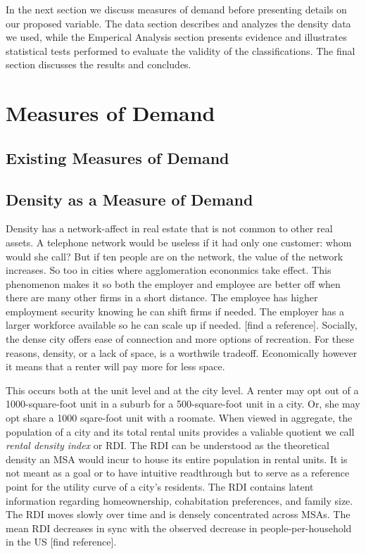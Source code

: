 \documentclass[sn-mathphys-num]{sn-jnl}%
\theoremstyle{thmstyleone}%
\theoremstyle{thmstyletwo}%
\theoremstyle{thmstylethree}%
\begin{document}
In the next section we discuss measures of demand before presenting details on our proposed variable. The data section describes and analyzes the density data we used, while the Emperical Analysis section presents evidence and illustrates statistical tests performed to evaluate the validity of the classifications. The final section discusses the results and concludes. 
 
\section{Measures of Demand}
\subsection{Existing Measures of Demand}
\subsection{Density as a Measure of Demand}
Density has a network-affect in real estate that is not common to other real assets. A telephone network would be useless if it had only one customer: whom would she call? But if ten people are on the network, the value of the network increases. So too in cities where agglomeration econonmics take effect. This phenomenon makes it so both the employer and employee are better off when there are many other firms in a short distance. The employee has higher employment security knowing he can shift firms if needed. The employer has a larger workforce available so he can scale up if needed. [find a reference]. Socially, the dense city offers ease of connection and more options of recreation. For these reasons, density, or a lack of space, is a worthwile tradeoff. Economically however it means that a renter will pay more for less space.

This occurs both at the unit level and at the city level. A renter may opt out of a 1000-square-foot unit in a suburb for a 500-square-foot unit in a city. Or, she may opt share a 1000 sqare-foot unit with a roomate. When viewed in aggregate, the population of a city and its total rental units provides a valiable quotient we call \textit{rental density index} or RDI. The RDI can be understood as the theoretical density an MSA would incur to house its entire population in rental units. It is not meant as a goal or to have intuitive readthrough but to serve as a reference point for the utility curve of a city's residents. 
The RDI contains latent information regarding homeownership, cohabitation preferences, and family size. The RDI moves slowly over time and is densely concentrated across MSAs. The mean RDI decreases in sync with the observed decrease in people-per-household in the US [find reference].
\end{document}

